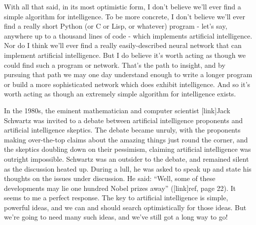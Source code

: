 \documentclass[a4paper,twoside,10pt]{book}
\begin{document}
With all that said, in its most optimistic form, I don't believe we'll ever find a simple algorithm for intelligence. To be more concrete, I don't believe we'll ever find a really short Python (or C or Lisp, or whatever) program - let's say, anywhere up to a thousand lines of code - which implements artificial intelligence. Nor do I think we'll ever find a really easily-described neural network that can implement artificial intelligence. But I do believe it's worth acting as though we could find such a program or network. That's the path to insight, and by pursuing that path we may one day understand enough to write a longer program or build a more sophisticated network which does exhibit intelligence. And so it's worth acting as though an extremely simple algorithm for intelligence exists.

In the 1980s, the eminent mathematician and computer scientist [link]Jack Schwartz was invited to a debate between artificial intelligence proponents and artificial intelligence skeptics. The debate became unruly, with the proponents making over-the-top claims about the amazing things just round the corner, and the skeptics doubling down on their pessimism, claiming artificial intelligence was outright impossible. Schwartz was an outsider to the debate, and remained silent as the discussion heated up. During a lull, he was asked to speak up and state his thoughts on the issues under discussion. He said: ``Well, some of these developments may lie one hundred Nobel prizes away'' ([link]ref, page 22). It seems to me a perfect response. The key to artificial intelligence is simple, powerful ideas, and we can and should search optimistically for those ideas. But we're going to need many such ideas, and we've still got a long way to go!
\end{document}
